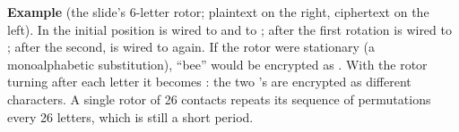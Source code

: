 \begin{center}
\end{center}
\textbf{Example} (the slide's 6-letter rotor; plaintext on the right, ciphertext on the left). In the initial position  is wired to  and  to ; after the first rotation  is wired to ; after the second,  is wired to  again. If the rotor were stationary (a monoalphabetic substitution), ``bee'' would be encrypted as . With the rotor turning after each letter it becomes : the two 's are encrypted as different characters. A single rotor of 26 contacts repeats its sequence of permutations every 26 letters, which is still a short period.

